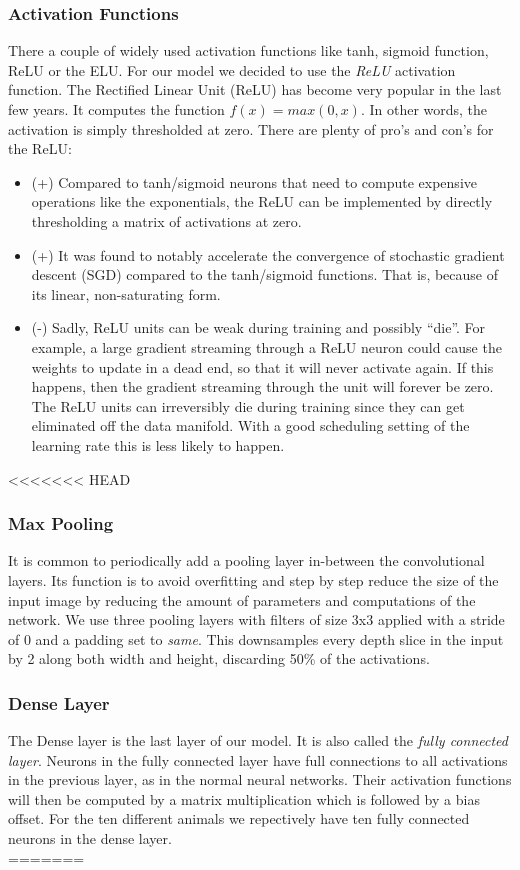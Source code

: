 \documentclass[journal]{IEEEtran}
\begin{document}
\subsubsection{Activation Functions}
There a couple of widely used activation functions like tanh, sigmoid function, ReLU or the ELU. For our model we decided to use the \textit{ReLU} activation function. The Rectified Linear Unit (ReLU) has become very popular in the last few years. It computes the function \(f(x)=max(0,x)\). In other words, the activation is simply thresholded at zero. There are plenty of pro's and con's for the ReLU:
\begin{itemize}
\item (+) Compared to tanh/sigmoid neurons that need to compute expensive operations  like the exponentials, the ReLU can be implemented by directly thresholding a matrix of activations at zero.
\item (+) It was found to notably accelerate the convergence of stochastic gradient descent (SGD) compared to the tanh/sigmoid functions. That is, because of its linear, non-saturating form.
\item (-) Sadly, ReLU units can be weak during training and possibly “die”. For example, a large gradient streaming through a ReLU neuron could cause the weights to update in a dead end, so that it will never activate again. If this happens, then the gradient streaming through the unit will forever be zero. The ReLU units can irreversibly die during training since they can get eliminated off the data manifold. With a good scheduling setting of the learning rate this is less likely to happen. \\
\end{itemize}
<<<<<<< HEAD
\subsubsection{Max Pooling}
It is common to periodically add a pooling layer in-between the convolutional layers. Its function is to avoid overfitting and step by step reduce the size of the input image by reducing the amount of parameters and computations of the network. We use three pooling layers with filters of size 3x3 applied with a stride of 0 and a padding set to \textit{same}. This downsamples every depth slice in the input by 2 along both width and height, discarding 50\% of the activations. \\
\subsubsection{Dense Layer}
The Dense layer is the last layer of our model. It is also called the \textit{fully connected layer}. Neurons in the fully connected layer have full connections to all activations in the previous layer, as in the normal neural networks. Their activation functions will then be computed by a matrix multiplication which is followed by a bias offset. 
For the ten different animals we repectively have ten fully connected neurons in the dense layer. \\
=======
\end{document}
